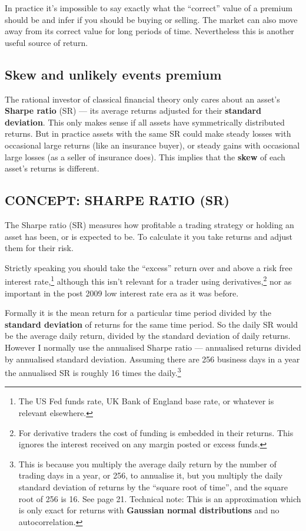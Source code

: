 In practice it's impossible to say exactly what the ``correct'' value of a premium should be and infer if you should be buying or selling. The market can also move away from its correct value for long periods of time. Nevertheless this is another useful source of return.

\subsection*{Skew and unlikely events premium}

The rational investor of classical financial theory only cares about an asset's \textbf{Sharpe ratio} (SR) --- its average returns adjusted for their \textbf{standard deviation}. This only makes sense if all assets have symmetrically distributed returns. But in practice assets with the same SR could make steady losses with occasional large returns (like an insurance buyer), or steady gains with occasional large losses (as a seller of insurance does). This implies that the \textbf{skew} of each asset's returns is different.

\subsection*{CONCEPT: SHARPE RATIO (SR)}

The Sharpe ratio (SR) measures how profitable a trading strategy or holding an asset has been, or is expected to be. To calculate it you take returns and adjust them for their risk.

Strictly speaking you should take the ``excess'' return over and above a risk free interest rate,\footnote{The US Fed funds rate, UK Bank of England base rate, or whatever is relevant elsewhere.} although this isn't relevant for a trader using derivatives,\footnote{For derivative traders the cost of funding is embedded in their returns. This ignores the interest received on any margin posted or excess funds.} nor as important in the post 2009 low interest rate era as it was before.

Formally it is the mean return for a particular time period divided by the \textbf{standard deviation} of returns for the same time period. So the daily SR would be the average daily return, divided by the standard deviation of daily returns. However I normally use the annualised Sharpe ratio --- annualised returns divided by annualised standard deviation. Assuming there are 256 business days in a year the annualised SR is roughly 16 times the daily.\footnote{This is because you multiply the average daily return by the number of trading days in a year, or 256, to annualise it, but you multiply the daily standard deviation of returns by the ``square root of time'', and the square root of 256 is 16. See page 21. Technical note: This is an approximation which is only exact for returns with \textbf{Gaussian normal distributions} and no autocorrelation.}

